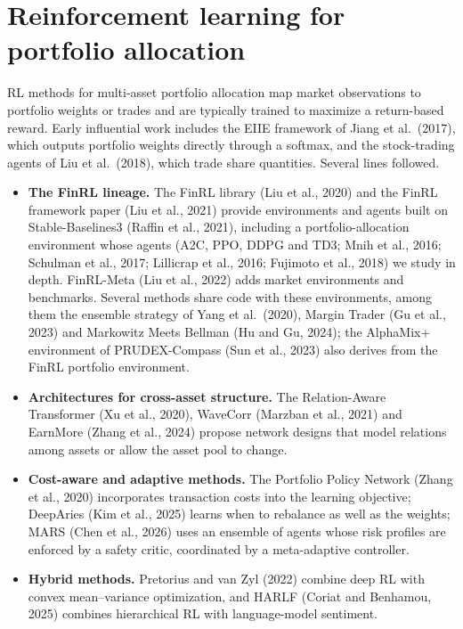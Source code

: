 \documentclass[12pt,a4paper]{report}
\providecommand{\tightlist}{\setlength{\itemsep}{0pt}\setlength{\parskip}{0pt}}
\begin{document}
\section{Reinforcement learning for portfolio
allocation}\label{reinforcement-learning-for-portfolio-allocation}

RL methods for multi-asset portfolio allocation map market observations
to portfolio weights or trades and are typically trained to maximize a
return-based reward. Early influential work includes the EIIE framework
of Jiang et al.~(2017), which outputs portfolio weights directly through
a softmax, and the stock-trading agents of Liu et al.~(2018), which
trade share quantities. Several lines followed.

\begin{itemize}
\tightlist
\item
  \textbf{The FinRL lineage.} The FinRL library (Liu et al., 2020) and
  the FinRL framework paper (Liu et al., 2021) provide environments and
  agents built on Stable-Baselines3 (Raffin et al., 2021), including a
  portfolio-allocation environment whose agents (A2C, PPO, DDPG and TD3;
  Mnih et al., 2016; Schulman et al., 2017; Lillicrap et al., 2016;
  Fujimoto et al., 2018) we study in depth. FinRL-Meta (Liu et al.,
  2022) adds market environments and benchmarks. Several methods share
  code with these environments, among them the ensemble strategy of Yang
  et al.~(2020), Margin Trader (Gu et al., 2023) and Markowitz Meets
  Bellman (Hu and Gu, 2024); the AlphaMix+ environment of PRUDEX-Compass
  (Sun et al., 2023) also derives from the FinRL portfolio environment.
\item
  \textbf{Architectures for cross-asset structure.} The Relation-Aware
  Transformer (Xu et al., 2020), WaveCorr (Marzban et al., 2021) and
  EarnMore (Zhang et al., 2024) propose network designs that model
  relations among assets or allow the asset pool to change.
\item
  \textbf{Cost-aware and adaptive methods.} The Portfolio Policy Network
  (Zhang et al., 2020) incorporates transaction costs into the learning
  objective; DeepAries (Kim et al., 2025) learns when to rebalance as
  well as the weights; MARS (Chen et al., 2026) uses an ensemble of
  agents whose risk profiles are enforced by a safety critic,
  coordinated by a meta-adaptive controller.
\item
  \textbf{Hybrid methods.} Pretorius and van Zyl (2022) combine deep RL
  with convex mean--variance optimization, and HARLF (Coriat and
  Benhamou, 2025) combines hierarchical RL with language-model
  sentiment.
\end{itemize}
\end{document}
